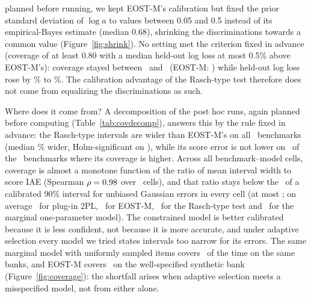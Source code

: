{planned before running, we kept EOST-M's calibration but fixed the prior
standard deviation of $\log a$ to values between 0.05 and 0.5 instead of its
empirical-Bayes estimate (median 0.68), shrinking the discriminations towards
a common value (Figure~\ref{fig:shrink}). No setting met the
criterion fixed in advance (coverage of at least 0.80 with a median held-out
log loss at most 0.5\% above EOST-M's): coverage stayed between \ShrMgCovMin\ and
\ShrMgCovMax\ (EOST-M: \ShrEostCov) while held-out log loss rose by
\ShrMgLLMin\% to \ShrMgLLMax\%. The calibration advantage of the Rasch-type
test therefore does not come from equalizing the discriminations as such.
\par
Where does it come from? A decomposition of the post hoc runs, again planned
before computing (Table~\ref{tab:covdecomp}), answers this by
the rule fixed in advance: the Rasch-type intervals are wider than EOST-M's on
all \PhThreeWiderBanks\ benchmarks (median \PhThreeWidthPct\% wider,
Holm-significant on \PhThreeWiderSig), while its score error is not lower on
\PhThreeIaeNotLower\ of the \PhThreeCovHigher\ benchmarks where its coverage is
higher. Across all benchmark--model cells, coverage is almost a monotone
function of the ratio of mean interval width to score IAE (Spearman
$\rho=0.98$ over \PhThreeCells\ cells), and that ratio stays below the
\PhThreeGauss\ of a calibrated 90\% interval for unbiased Gaussian errors in
every cell (at most \PhThreeMaxRatio; on average \PhThreeRatioPi\ for plug-in
2PL, \PhThreeRatioEost\ for EOST-M, \PhThreeRatioRasch\ for the Rasch-type test
and \PhThreeRatioOnePrMg\ for the marginal one-parameter model). The
constrained model is better calibrated because it is less confident, not
because it is more accurate, and under adaptive selection every model we tried
states intervals too narrow for its errors. The same marginal model with
uniformly sampled items covers \CovRandmg\ of the time on the same banks, and
EOST-M covers \SynTwoplEigMgCovNeight\ on the well-specified synthetic bank
(Figure~\ref{fig:coverage}): the shortfall arises when adaptive selection meets
a misspecified model, not from either alone.}
